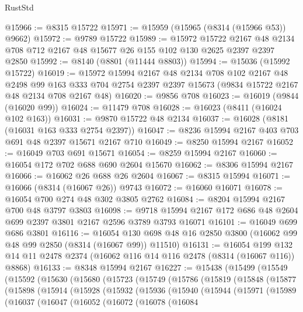 \begin{lexlean}{RustStd}
\begin{coremodule}
@15966 := @8315 @15722
@15971 := @15959 (@15965 (@8314 (@15966 @53)) @9662)
@15972 := @9789 @15722
@15989 := @15972
    @15722
    @2167
    @48
    @2134
    @708
    @712
    @2167
    @48
    @15677
    @26
    @155
    @102
    @130
    @2625
    @2397
    @2397
    @2850
@15992 := @8140 (@8801 (@11444 @8803))
@15994 := @15036 (@15992 @15722)
@16019 := @15972
    @15994
    @2167
    @48
    @2134
    @708
    @102
    @2167
    @48
    @2498
    @99
    @163
    @333
    @704
    @2754
    @2397
    @2397
    @15673
    (@9834 @15722 @2167 @48 @2134 @708 @2167 @48)
@16020 := @9856 @708
@16023 := @16019 (@9844 (@16020 @99))
@16024 := @11479 @708
@16028 := @16023 (@8411 (@16024 @102 @163))
@16031 := @9870 @15722 @48 @2134
@16037 := @16028 (@8181 (@16031 @163 @333 @2754 @2397))
@16047 := @8236 @15994 @2167 @403 @703 @691 @48 @2397 @15671 @2167 @710
@16049 := @8250 @15994 @2167
@16052 := @16049 @703 @691 @15671
@16054 := @8259 @15994 @2167
@16060 := @16054 @172 @702 @688 @690 @2604 @15670
@16062 := @8306 @15994 @2167
@16066 := @16062 @26 @688 @26 @2604
@16067 := @8315 @15994
@16071 := @16066 (@8314 (@16067 @26)) @9743
@16072 := @16060 @16071
@16078 := @16054 @700 @274 @48 @302 @3805 @2762
@16084 := @8204 @15994 @2167 @700 @48 @3797 @3803
@16098 := @9718 @15994 @2167 @172 @686 @48 @2604 @699 @2397 @3801 @2167 @2596 @3789 @3793 @16071
@16101 := @16049 @699 @686 @3801
@16116 := @16054
    @130
    @698
    @48
    @16
    @2850
    @3800
    (@16062 @99 @48 @99 @2850 (@8314 (@16067 @99)) @11510)
@16131 := @16054
    @199
    @132
    @14
    @11
    @2478
    @2374
    (@16062 @116 @14 @116 @2478 (@8314 (@16067 @116)) @8868)
@16133 := @8348 @15994 @2167
@16227 := @15438
    (@15499
      (@15549
        (@15592
          (@15630
            (@15680
              (@15723
                (@15749
                  (@15786
                    (@15819
                      (@15848
                        (@15877
                          (@15898
                            (@15914
                              (@15928
                                (@15932
                                  (@15936
                                    (@15940
                                      (@15944
                                        (@15971
                                          (@15989
                                            (@16037
                                              (@16047
                                                (@16052
                                                  (@16072
                                                    (@16078
                                                      (@16084

\end{coremodule}
\end{lexlean}

